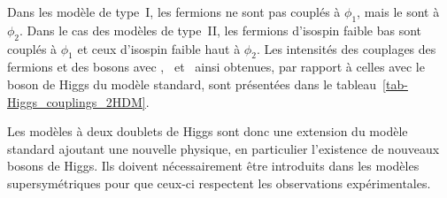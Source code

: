 \par
Dans les modèle de type~I, les fermions ne sont pas couplés à $\phi_1$, mais le sont à $\phi_2$.
Dans le cas des modèles de type~II, les fermions d'isospin faible bas sont couplés à $\phi_1$ et ceux d'isospin faible haut à $\phi_2$.
Les intensités des couplages des fermions et des bosons avec \higgs, \Higgs\ et \HiggsA\ ainsi obtenues, par rapport à celles avec le boson de Higgs du modèle standard, sont présentées dans le tableau~\ref{tab-Higgs_couplings_2HDM}.
\par Les modèles à deux doublets de Higgs sont donc une extension du modèle standard ajoutant une nouvelle physique, en particulier l'existence de nouveaux bosons de Higgs.
Ils doivent nécessairement être introduits dans les modèles supersymétriques pour que ceux-ci respectent les observations expérimentales.
